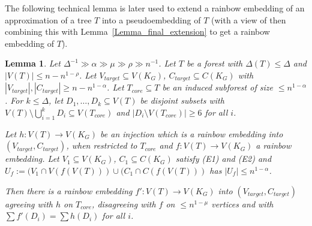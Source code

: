 \documentclass[a4paper,11pt,hidelinks]{amsart}
\newtheorem{lemma}[theorem]{Lemma}
\theoremstyle{definition}
\begin{document}
 
The following technical lemma is later used to extend a rainbow embedding of an approximation of a tree $T$ into a pseudoembedding of $T$ (with a view of then combining this with Lemma~\ref{Lemma_final_extension} to get a rainbow embedding of $T$).
\begin{lemma}\label{Lemma_modify_random_embedding}
Let $\Delta^{-1} \gg \alpha\gg \mu \gg \rho\gg n^{-1}$.
Let $T$ be a forest with $\Delta(T)\leq \Delta$ and $|V(T)|\leq n-n^{1-\rho}$.
Let $V_{target}\subseteq V(K_G)$, $C_{target}\subseteq C(K_G)$ with $|V_{target}|, |C_{target}|\geq n-n^{1-\alpha}$. Let $T_{core}\subseteq T$ be an induced subforest of size $\leq n^{1-\alpha}$. For $k\leq \Delta$, let $D_1, \dots, D_{k}\subseteq V(T)$ be disjoint subsets with $V(T)\setminus \bigcup_{i=1}^kD_i\subseteq V(T_{core})$ and $|D_i\setminus V(T_{core})|\geq 6$ for all $i$.

Let $h:V(T)\to V(K_G)$ be an injection which is a rainbow embedding into $(V_{target}, C_{target})$, when restricted to $T_{core}$  and $f:V(T)\to V(K_G)$ a  rainbow embedding. Let $V_1\subseteq V(K_G)$, $C_1\subseteq C(K_G)$ satisfy (E1)  and (E2) and  $U_f:=(V_1\cap V(f(V(T)))\cup (C_1\cap C(f(V(T)))$  has $|U_f|\leq n^{1-\alpha}$.

Then there is a rainbow embedding  $f':V(T)\to V(K_G)$ into $(V_{target}, C_{target})$ agreeing with $h$ on $T_{core}$,  disagreeing with $f$ on $\leq n^{1-\mu}$ vertices and with $\sum f'(D_i)= \sum h(D_i)$ for all $i$.
\end{lemma}
\end{document}
